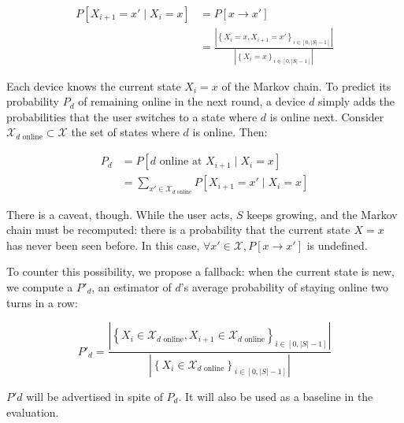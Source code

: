 \begin{align*}
P\left[X_{i+1}=x' \mid X_i=x \right] &= P\left[x \rightarrow x' \right] \\&= \frac{\left| \left\{ X_i = x, X_{i+1} = x' \right\}_{i \in \left[0, |S| - 1\right]} \right|}{\left| \left\{ X_i = x \right\}_{i \in \left[0, |S| - 1\right]} \right|}
\end{align*}

Each device knows the current state $X_i=x$ of the Markov chain.
To predict its probability $P_d$ of remaining online in the next round, 
a device $d$ simply adds the probabilities that the user switches to a state where $d$ is online next.
Consider $\mathcal{X}_{d\text{ online}} \subset \mathcal{X}$ the set of states where $d$ is online. Then:

\begin{align*}
P_d & = P\left[d\text{ online at }X_{i+1} \mid X_i=x\right] \\ & = \sum\limits_{x' \in \mathcal{X}_{d\text{ online}}} P\left[ X_{i+1}=x' \mid X_i=x \right]
\end{align*}

There is a caveat, though.
While the user acts, $S$ keeps growing, and the Markov chain must be recomputed: there is a probability that the current state $X=x$ has never been seen before.
In this case, $\forall x' \in \mathcal{X}, P\left[x \rightarrow x'\right]$ is undefined.

To counter this possibility, we propose a fallback:
when the current state is new, we compute a $P'_d$, an estimator of $d$'s average probability of staying online two turns in a row:

$$ P'_d = \frac{\left| \left\{ X_i \in \mathcal{X}_{d\text{ online}}, X_{i+1} \in \mathcal{X}_{d\text{ online}} \right\}_{i \in \left[0, |S| - 1\right]} \right|}{\left| \left\{ X_i \in \mathcal{X}_{d\text{ online}} \right\}_{i \in \left[0, |S| - 1\right]} \right|} $$

$P'd$ will be advertised in spite of $P_d$. It will also be used as a baseline in the evaluation.


